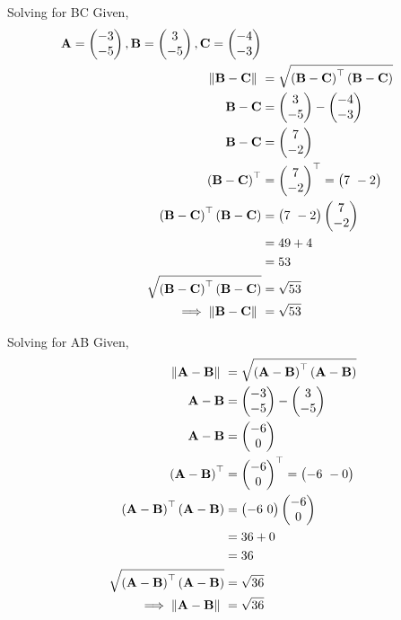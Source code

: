 \solution
Solving for BC
Given, 
\begin{align}
\vec{A} = \myvec{-3\\-5},
\vec{B} = \myvec{3\\-5},
\vec{C} = \myvec{-4\\-3} \\  
 \norm{\vec{B}-\vec{C}}\ &=  \sqrt{\brak{\vec{B}-\vec{C}}^{\top}\brak{\vec{B}-\vec{C}}} \\
 \vec{B}-\vec{C} &= \myvec{3 \\ -5} - \myvec{-4 \\ -3} \\
 \vec{B}-\vec{C} &= \myvec{7 \\ -2} \\
 \brak{\vec{B}-\vec{C}}^{\top} &= {\myvec{7 \\ -2}}^{\top} = \myvec{7 \ -2} \\
\brak{\vec{B}-\vec{C}}^{\top}\brak{\vec{B}-\vec{C}} &= \myvec{7 \ -2} \myvec{7 \\ -2}\\
             &= 49+4 \\
             &= 53 \\  
 \sqrt{\brak{\vec{B}-\vec{C}}^{\top}\brak{\vec{B}-\vec{C}}} &= \sqrt{53}	\\
	\implies \norm{\vec{B}-\vec{C}}\ &= \sqrt{53} 
\end{align}

Solving for AB 
Given, 
\begin{align}  
 \norm{\vec{A}-\vec{B}}\ &=  \sqrt{\brak{\vec{A}-\vec{B}}^{\top}\brak{\vec{A}-\vec{B}}} \\
 \vec{A}-\vec{B} &= \myvec{-3 \\ -5} - \myvec{3 \\ -5} \\
 \vec{A}-\vec{B} &= \myvec{-6 \\ 0} \\
 \brak{\vec{A}-\vec{B}}^{\top} &= {\myvec{-6 \\ 0}}^{\top} = \myvec{-6 \ -0} \\
\brak{\vec{A}-\vec{B}}^{\top}\brak{\vec{A}-\vec{B}} &= \myvec{-6 \ 0} \myvec{-6 \\ 0}\\
             &= 36 + 0 \\
             &= 36 \\  
	\sqrt{\brak{\vec{A}-\vec{B}}^{\top}\brak{\vec{A}-\vec{B}}} &= \sqrt{36}	\\
	\implies \norm{\vec{A}-\vec{B}}\ &= \sqrt{36} 
\end{align}

